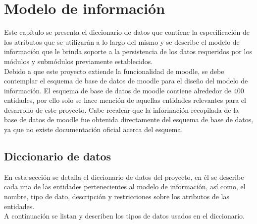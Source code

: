 \section{Modelo de información}
\label{ch:dominioDatos}

 Este capítulo se presenta el diccionario de datos que contiene la especificación de los
 atributos que se utilizarán a lo largo del mismo y se describe el modelo
 de información que le brinda soporte a la persistencia de los datos requeridos
 por los módulos y submódulos previamente establecidos.\\

 \noindent Debido a que este proyecto extiende la funcionalidad de moodle,
 se debe contemplar el esquema de base de datos de moodle para el diseño del modelo de información.
 El esquema de base de datos de moodle contiene alrededor de 400 entidades, por ello solo se hace mención de aquellas
 entidades relevantes para el desarrollo de este proyecto. Cabe recalcar que la información
 recopilada de la base de datos de moodle fue obtenida
 directamente del esquema de base de datos, ya que no existe documentación oficial acerca
 del esquema.

\subsection{Diccionario de datos}

 En esta sección se detalla el diccionario de datos del proyecto, en él se describe cada una
 de las entidades pertenecientes al modelo de información, así como, el nombre, tipo de dato,
 descripción y restricciones sobre los atributos de las entidades.\\

 A continuación se listan y describen los tipos de
 datos usados en el diccionario.

